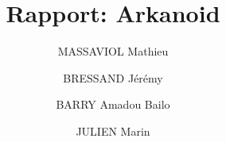 \documentclass{article}
\begin{document}
  \title{Rapport: Arkanoid}
  \author{MASSAVIOL Mathieu\and BRESSAND Jérémy \and BARRY Amadou Bailo \and JULIEN Marin}

  

  \tableofcontents
  \newpage
  
  
  
  
  
    
  
\end{document}
